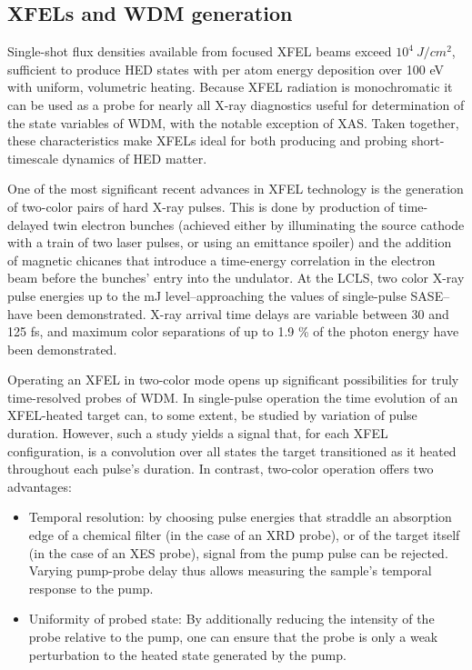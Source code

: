 \documentclass [11pt, proquest, article] {uwthesis}[2016/11/22]
\begin{document}


\subsection{XFELs and WDM generation}
Single-shot flux densities available from focused XFEL beams exceed $10^4~J/cm^2$, sufficient to produce HED states with per atom energy deposition over 100 eV with uniform, volumetric heating.  Because XFEL radiation is monochromatic it can be used as a probe for nearly all X-ray diagnostics useful for determination of the state variables of WDM, with the notable exception of XAS.  Taken together, these characteristics make XFELs ideal for both producing and probing short-timescale dynamics of HED matter.%

One of the most significant recent advances in XFEL technology is the generation of two-color pairs of hard X-ray pulses. This is done by production of time-delayed twin electron bunches (achieved either by illuminating the source cathode with a train of two laser pulses, or using an emittance spoiler) and the addition of magnetic chicanes that introduce a time-energy correlation in the electron beam before the bunches' entry into the undulator.\cite{marinelli2013multicolor} At the LCLS, two color X-ray pulse energies up to the mJ level--approaching the values of single-pulse SASE--have been demonstrated. \cite{marinelli2015high} X-ray arrival time delays are variable between 30 and 125 fs, and maximum color separations of up to 1.9 \% of the photon energy have been demonstrated.\cite{lutman2014demonstration}

Operating an XFEL in two-color mode opens up significant possibilities for truly time-resolved probes of WDM. In single-pulse operation the time evolution of an XFEL-heated target can, to some extent, be studied by variation of pulse duration. However, such a study yields a signal that, for each XFEL configuration, is a convolution over all states the target transitioned as it heated throughout each pulse's duration. In contrast, two-color operation offers two advantages:

\begin{itemize}
\item{Temporal resolution: by choosing pulse energies that straddle an absorption edge of a chemical filter (in the case of an XRD probe), or of the target itself (in the case of an XES probe), signal from the pump pulse can be rejected. Varying pump-probe delay thus allows measuring the sample's temporal response to the pump.}
\item{Uniformity of probed state: By additionally reducing the intensity of the probe relative to the pump, one can ensure that the probe is only a weak perturbation to the heated state generated by the pump.}
\end{itemize}
\end{document}
